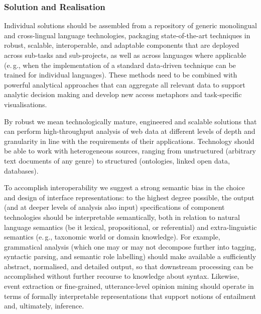 \documentclass[10pt, plain]{../../metanetpaper}
\begin{document}
\begin{multicols}{2}
\subsubsection{Solution and Realisation}
\label{sec:solut-techn-real-pt2}

Individual solutions should be assembled from a repository of generic monolingual and cross-lingual language technologies, packaging state-of-the-art techniques in robust, scalable, interoperable, and adaptable components that are deployed across sub-tasks and sub-projects, as well as across languages where applicable (e.\,g., when the implementation of a standard data-driven technique can be trained for individual languages). These methods need to be combined with powerful analytical approaches that can aggregate all relevant data to support analytic decision making and develop new access metaphors and task-specific visualisations.
 
By robust we mean technologically mature, engineered and scalable solutions that can perform high-throughput analysis of web data at different levels of depth and granularity in line with the requirements of their applications. Technology should be able to work with heterogeneous sources, ranging from unstructured (arbitrary text documents of any genre) to structured (ontologies, linked open data, databases).

To accomplish interoperability we suggest a strong semantic bias in the choice and design of interface representations: to the highest degree possible, the output (and at deeper levels of analysis also input) specifications of component technologies should be interpretable semantically, both in relation to natural language semantics (be it lexical, propositional, or referential) and extra-linguistic semantics (e.\,g., taxonomic world or domain knowledge). For example, grammatical analysis (which one may or may not decompose further into tagging, syntactic parsing, and semantic role labelling) should make available a sufficiently abstract, normalised, and detailed output, so that downstream processing can be accomplished without further recourse to knowledge about syntax. Likewise, event extraction or fine-grained, utterance-level opinion mining should operate in terms of formally interpretable representations that support notions of entailment and, ultimately, inference.


\end{multicols}
\end{document}
